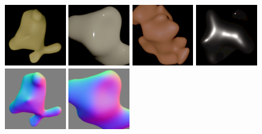     \begin{subfigure}[t]{0.47\textwidth}
    \centering
    \\
    \includegraphics[width=0.235\textwidth]{ch-psfcn/images/Dataset/simple/l_000,-0.28,-0.27,0.92_gm.png}
    \includegraphics[width=0.235\textwidth]{ch-psfcn/images/Dataset/simple/l_002,0.60,0.12,0.79_gm.png}
    \includegraphics[width=0.235\textwidth]{ch-psfcn/images/Dataset/simple/l_006,-0.12,0.05,0.99_gm.png}
    \includegraphics[width=0.235\textwidth]{ch-psfcn/images/Dataset/simple/l_022,-0.21,-0.20,0.96_gm.png}\\
    \includegraphics[width=0.235\textwidth]{ch-psfcn/images/Dataset/simple/blob06_s-0.80_x-250_y-250_normal.png}
    \includegraphics[width=0.235\textwidth]{ch-psfcn/images/Dataset/simple/blob02_s-1.00_x-250_y-250_normal.png}

\end{subfigure}
